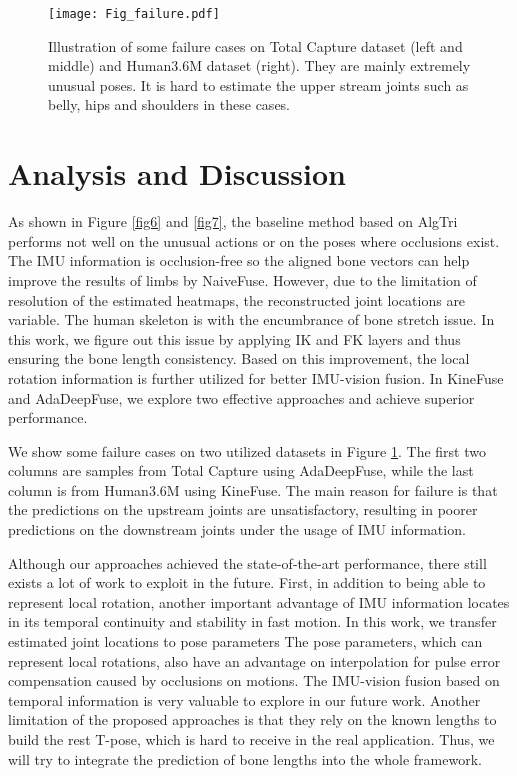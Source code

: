 \documentclass[lettersize,journal]{IEEEtran}
\begin{document}
\begin{figure}[!tp]
 \begin{center}
 	\centerline{\texttt{[image: Fig\_failure.pdf]}}
\caption{Illustration of some failure cases on Total Capture dataset (left and middle) and Human3.6M dataset (right). They are mainly extremely unusual poses. It is hard to estimate the upper stream joints such as belly, hips and shoulders in these cases.}
\label{fig8}
\end{center}
\end{figure}

\section{Analysis and Discussion}

As shown in Figure \ref{fig6} and \ref{fig7}, the baseline method based on AlgTri performs not well on the unusual actions or on the poses where occlusions exist. The IMU information is occlusion-free so the aligned bone vectors can help improve the results of limbs by NaiveFuse. However, due to the limitation of resolution of the estimated heatmaps, the reconstructed joint locations are variable. The human skeleton is with the encumbrance of bone stretch issue. In this work, we figure out this issue by applying IK and FK layers and thus ensuring the bone length consistency. Based on this improvement, the local rotation information is further utilized for better IMU-vision fusion. In KineFuse and AdaDeepFuse, we explore two effective approaches and achieve superior performance. 

We show some failure cases on two utilized datasets in Figure \ref{fig8}. The first two columns are samples from Total Capture using AdaDeepFuse, while the last column is from Human3.6M using KineFuse. The main reason for failure is that the predictions on the upstream joints are unsatisfactory, resulting in poorer predictions on the downstream joints under the usage of IMU information.

Although our approaches achieved the state-of-the-art performance, there still exists a lot of work to exploit in the future. First, in addition to being able to represent local rotation, another important advantage of IMU information locates in its temporal continuity and stability in fast motion. In this work, we transfer estimated joint locations to pose parameters The pose parameters, which can represent local rotations, also have an advantage on interpolation for pulse error compensation caused by occlusions on motions. The IMU-vision fusion based on temporal information is very valuable to explore in our future work. Another limitation of the proposed approaches is that they rely on the known lengths to build the rest T-pose, which is hard to receive in the real application. Thus, we will try to integrate the prediction of bone lengths into the whole framework.
\end{document}
